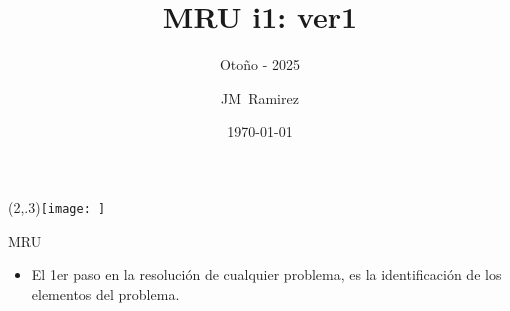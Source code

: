 \documentclass{beamer}
\title{MRU i1: ver1}
\subtitle{Otoño - 2025}
\author{JM~Ramirez}
\date{\today}
\begin{document}
\maketitle
\Logo(2,.3){\texttt{[image: ]}}

\begin{frame}{MRU}
% 
 


 
\begin{itemize}                                                              

\item El 1er paso en la resoluci\'on de cualquier problema, es la
identificaci\'on de los elementos del problema.            
              
\end{itemize}

\end{frame}
\end{document}
